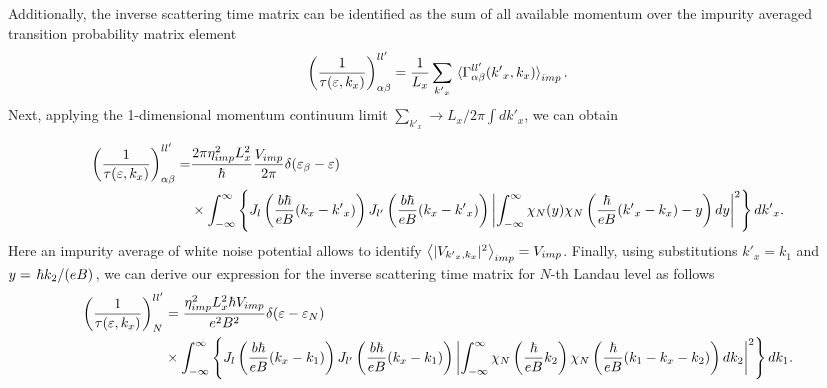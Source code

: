 \documentclass[
 reprint,
 amsmath,amssymb,
 aps,
 prb,
]{revtex4-2}
\begin{document}
Additionally, the inverse scattering time matrix can be identified as the sum of all available momentum over the impurity averaged transition probability matrix element \cite{wackerl20,wackerlthesis20}
\begin{equation} \label{eq:41}
    \left(\frac{1}{\tau(\varepsilon,k_x)} \right)^{ll'}_{\alpha\beta} =
    \frac{1}{L_x} \sum_{{k'}_x}
    \expval**{\Gamma_{\alpha\beta}^{ll'}({k'}_x,k_x)}_{imp}.
\end{equation}
Next, applying the 1-dimensional momentum continuum limit $\sum_{{k'}_x} \longrightarrow {L_x}/{2\pi}\int d {k'}_x$, we can obtain
\begin{widetext}
\begin{equation} \label{eq:42}
  \begin{aligned}
    \left(\frac{1}{\tau(\varepsilon,k_x)}\right)^{ll'}_{\alpha\beta} = &
    \frac { 2\pi \eta_{imp}^2 L_x^2}{ \hbar}
    \frac{V_{imp}}{2\pi}
    \delta(\varepsilon_{\beta} - \varepsilon) \\
    & \times
    \int_{-\infty}^{\infty} \left\{
    J_l\bm{\left(}\frac{b\hbar}{eB}({k}_x - {k'}_x)\bm{\right)}
    J_{l'}\bm{\left(}\frac{b\hbar}{eB}({k}_x - {k'}_x)\bm{\right)}
    \left|
    \int_{-\infty}^{\infty}
    {\chi}_N(y)
    {\chi}_N \bm{\left(}\frac{\hbar}{eB} ({k'}_x - {k}_x) - y \bm{\right)} dy\right|^2 \right\} d {k'}_x.
  \end{aligned}
\end{equation}
Here an impurity average of white noise potential allows to identify $\expval{|V_{{k'}_x,k_x}|^2}_{imp} = V_{imp}$.
Finally, using substitutions $k'_x = k_1$ and $y = \flatfrac{\hbar{k_2}}{(eB)}$, we can derive our expression for the inverse scattering time matrix for $N$-th Landau
level as follows
\begin{equation} \label{eq:43}
  \begin{aligned}
    \left(\frac{1}{\tau(\varepsilon,k_x)}\right)^{ll'}_{N} &=
    \frac { \eta_{imp}^2 L_x^2 \hbar V_{imp}}{e^2B^2}
    \delta(\varepsilon - \varepsilon_{N}) \\
    & \times
    \int_{-\infty}^{\infty} \left\{
    J_l\bm{\left(}\frac{b\hbar}{eB}({k}_x - k_1)\bm{\right)}
    J_{l'}\bm{\left(}\frac{b\hbar}{eB}({k}_x - k_1)\bm{\right)}
    \left|
    \int_{-\infty}^{\infty}
    {\chi}_N\left(\frac{\hbar}{eB}k_2 \right)
    {\chi}_N \bm{\left(}\frac{\hbar}{eB} (k_1 - k_x - k_2) \bm{\right)} dk_2 \right|^2 \right\} d k_1.
  \end{aligned}
\end{equation}
\end{widetext}
\end{document}
